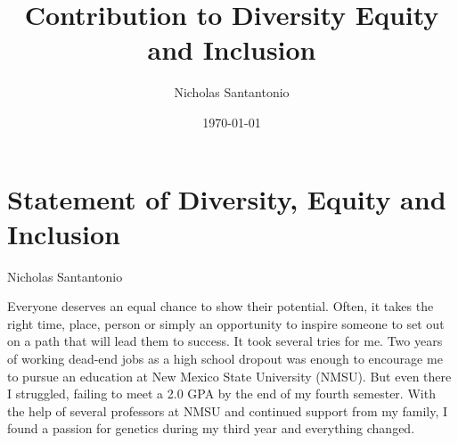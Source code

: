 \documentclass[11pt]{article}
\title{Contribution to Diversity Equity and Inclusion}
\author{Nicholas Santantonio}
\date{\today}
\newcommand{\amy}[1]{{\color{amyCol} [\textbf{Amy:} #1]}}
\begin{document}

\section*{\centering Statement of Diversity, Equity and Inclusion}
\begin{center} Nicholas Santantonio \end{center}


\noindent {}

\medskip

Everyone deserves an equal chance to show their potential. Often, it takes the right time, place, person or simply an opportunity to inspire someone to set out on a path that will lead them to success. It took several tries for me. Two years of working dead-end jobs as a high school dropout was enough to encourage me to pursue an education at New Mexico State University (NMSU). But even there I struggled, failing to meet a 2.0 GPA by the end of my fourth semester. With the help of several professors at NMSU and continued support from my family, I found a passion for genetics during my third year and everything changed.
\end{document}
